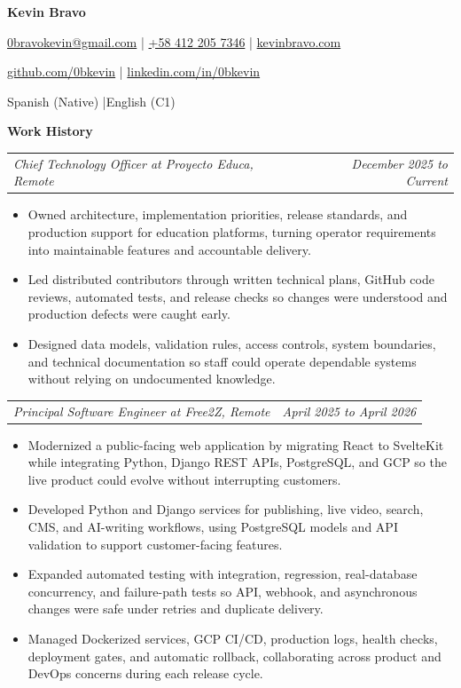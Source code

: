 \documentclass[10pt,letterpaper]{article}
\makeatletter
\newcommand{\bodyfont}{\fontsize{10.5}{15.75}\selectfont}
\newcommand{\contactfont}{\fontsize{12}{15}\selectfont}
\newcommand{\sectiontitle}[1]{%
  \vspace{4pt}
  {\bodyfont\textbf{#1}}\par
  \nopagebreak[4]
  \vspace{2pt}
}
\newcommand{\roleline}[2]{%
  \begin{tabularx}{\textwidth}{@{}Xr@{}}
    \bodyfont\textit{#1} & \bodyfont\textit{#2}
  \end{tabularx}
  \nopagebreak[4]
  \vspace{1pt}
}
\makeatother
\begin{document}
\bodyfont
\raggedright

\begin{center}
  {\fontsize{14}{17}\selectfont\textbf{Kevin Bravo}}\par
  \vspace{3pt}
  {\contactfont
    \href{mailto:0bravokevin@gmail.com}{0bravokevin@gmail.com}
    \enspace|\enspace
    \href{tel:+584122057346}{+58 412 205 7346}
    \enspace|\enspace
    \href{https://kevinbravo.com}{kevinbravo.com}
  }\par
  {\contactfont
    \href{https://github.com/0bkevin}{github.com/0bkevin}
    \enspace|\enspace
    \href{https://www.linkedin.com/in/0bkevin/}{linkedin.com/in/0bkevin}
  }\par
  {\contactfont Spanish (Native) \enspace|\enspace English (C1)}
\end{center}

\sectiontitle{Work History}

\roleline{Chief Technology Officer at Proyecto Educa, Remote}{December 2025 to Current}
\begin{itemize}
  \item Owned architecture, implementation priorities, release standards, and production support for education platforms, turning operator requirements into maintainable features and accountable delivery.
  \item Led distributed contributors through written technical plans, GitHub code reviews, automated tests, and release checks so changes were understood and production defects were caught early.
  \item Designed data models, validation rules, access controls, system boundaries, and technical documentation so staff could operate dependable systems without relying on undocumented knowledge.
\end{itemize}

\vspace{3pt}
\roleline{Principal Software Engineer at Free2Z, Remote}{April 2025 to April 2026}
\begin{itemize}
  \item Modernized a public-facing web application by migrating React to SvelteKit while integrating Python, Django REST APIs, PostgreSQL, and GCP so the live product could evolve without interrupting customers.
  \item Developed Python and Django services for publishing, live video, search, CMS, and AI-writing workflows, using PostgreSQL models and API validation to support customer-facing features.
  \item Expanded automated testing with integration, regression, real-database concurrency, and failure-path tests so API, webhook, and asynchronous changes were safe under retries and duplicate delivery.
  \item Managed Dockerized services, GCP CI/CD, production logs, health checks, deployment gates, and automatic rollback, collaborating across product and DevOps concerns during each release cycle.
\end{itemize}
\end{document}
